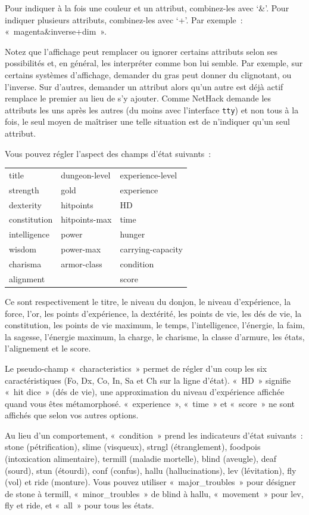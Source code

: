 \documentclass[titlepage]{article}
\begin{document}
Pour indiquer à la fois une couleur et un attribut, combinez-les avec
`\&'.
Pour indiquer plusieurs attributs, combinez-les avec `+'.
Par exemple~: «~magenta\&inverse+dim~».


Notez que l'affichage peut remplacer ou ignorer certains attributs selon
ses possibilités et, en général, les interpréter comme bon lui semble.
Par exemple, sur certains systèmes d'affichage, demander du gras peut
donner du clignotant, ou l'inverse.
Sur d'autres, demander un attribut alors qu'un autre est déjà actif
remplace le premier au lieu de s'y ajouter.
Comme NetHack demande les attributs les uns après les autres (du moins avec
l'interface \texttt{tty}) et non tous à la fois, le seul moyen de maîtriser
une telle situation est de n'indiquer qu'un seul attribut.


Vous pouvez régler l'aspect des champs d'état suivants~:
\begin{center}
\begin{tabular}{lll}
title & dungeon-level & experience-level\\
strength & gold & experience\\
dexterity & hitpoints & HD\\
constitution & hitpoints-max & time\\
intelligence & power & hunger\\
wisdom & power-max & carrying-capacity\\
charisma & armor-class & condition\\
alignment &  & score\\
\end{tabular}
\end{center}


Ce sont respectivement le titre, le niveau du donjon, le niveau
d'expérience, la force, l'or, les points d'expérience, la dextérité, les
points de vie, les dés de vie, la constitution, les points de vie
maximum, le temps, l'intelligence, l'énergie, la faim, la sagesse,
l'énergie maximum, la charge, le charisme, la classe d'armure, les états,
l'alignement et le score.


Le pseudo-champ «~characteristics~» permet de régler d'un coup
les six caractéristiques (Fo, Dx, Co, In, Sa et Ch sur la ligne d'état).
«~HD~» signifie «~hit dice~» (dés de vie), une
approximation du niveau d'expérience affichée quand vous êtes métamorphosé.
«~experience~», «~time~» et «~score~» ne sont
affichés que selon vos autres options.


Au lieu d'un comportement, «~condition~» prend les indicateurs
d'état suivants~: stone (pétrification), slime (visqueux), strngl
(étranglement), foodpois (intoxication alimentaire), termill (maladie
mortelle), blind (aveugle), deaf (sourd), stun (étourdi), conf (confus),
hallu (hallucinations), lev (lévitation), fly (vol) et ride (monture).
Vous pouvez utiliser «~major\_troubles~» pour désigner de stone à
termill, «~minor\_troubles~» de blind à hallu,
«~movement~» pour lev, fly et ride, et «~all~» pour tous
les états.
\end{document}
